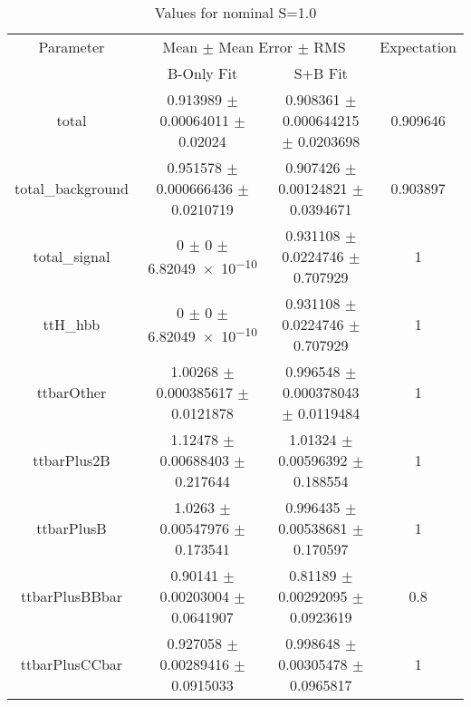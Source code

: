 \begin{table}
\centering
\caption{Values for nominal S=1.0}
\begin{tabular}{cccc}
\toprule
Parameter & \multicolumn{2}{c}{Mean $\pm$ Mean Error $\pm$ RMS} & Expectation\\
 & B-Only Fit & S+B Fit & \\
\midrule
total & \num{0.913989} $\pm$ \num{0.00064011} $\pm$ \num{0.02024} & \num{0.908361} $\pm$ \num{0.000644215} $\pm$ \num{0.0203698} & \num{0.909646}\\
total\_background & \num{0.951578} $\pm$ \num{0.000666436} $\pm$ \num{0.0210719} & \num{0.907426} $\pm$ \num{0.00124821} $\pm$ \num{0.0394671} & \num{0.903897}\\
total\_signal & \num{0} $\pm$ \num{0} $\pm$ \num{6.82049e-10} & \num{0.931108} $\pm$ \num{0.0224746} $\pm$ \num{0.707929} & \num{1}\\
ttH\_hbb & \num{0} $\pm$ \num{0} $\pm$ \num{6.82049e-10} & \num{0.931108} $\pm$ \num{0.0224746} $\pm$ \num{0.707929} & \num{1}\\
ttbarOther & \num{1.00268} $\pm$ \num{0.000385617} $\pm$ \num{0.0121878} & \num{0.996548} $\pm$ \num{0.000378043} $\pm$ \num{0.0119484} & \num{1}\\
ttbarPlus2B & \num{1.12478} $\pm$ \num{0.00688403} $\pm$ \num{0.217644} & \num{1.01324} $\pm$ \num{0.00596392} $\pm$ \num{0.188554} & \num{1}\\
ttbarPlusB & \num{1.0263} $\pm$ \num{0.00547976} $\pm$ \num{0.173541} & \num{0.996435} $\pm$ \num{0.00538681} $\pm$ \num{0.170597} & \num{1}\\
ttbarPlusBBbar & \num{0.90141} $\pm$ \num{0.00203004} $\pm$ \num{0.0641907} & \num{0.81189} $\pm$ \num{0.00292095} $\pm$ \num{0.0923619} & \num{0.8}\\
ttbarPlusCCbar & \num{0.927058} $\pm$ \num{0.00289416} $\pm$ \num{0.0915033} & \num{0.998648} $\pm$ \num{0.00305478} $\pm$ \num{0.0965817} & \num{1}\\
\bottomrule
\end{tabular}
\end{table}